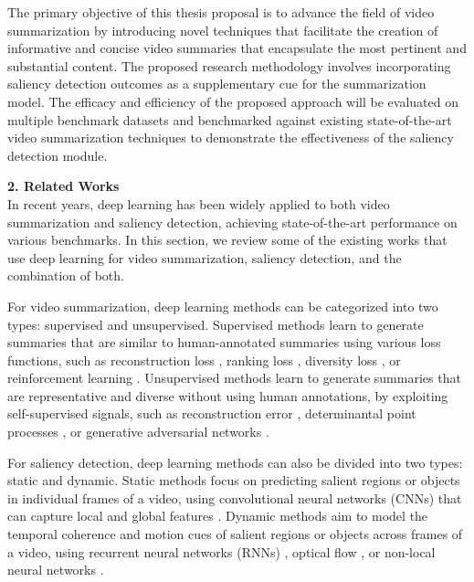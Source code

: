 \documentclass[14pt]{extarticle}
\begin{document}
    The primary objective of this thesis proposal is to advance the field of video summarization by introducing novel techniques that facilitate the creation of informative and concise video summaries that encapsulate the most pertinent and substantial content. The proposed research methodology involves incorporating saliency detection outcomes as a supplementary cue for the summarization model. The efficacy and efficiency of the proposed approach will be evaluated on multiple benchmark datasets and benchmarked against existing state-of-the-art video summarization techniques to demonstrate the effectiveness of the saliency detection module.

    \vspace{.5cm}
    \textbf{2. Related Works} \\
    In recent years, deep learning has been widely applied to both video summarization and saliency detection, achieving state-of-the-art performance on various benchmarks. In this section, we review some of the existing works that use deep learning for video summarization, saliency detection, and the combination of both.

    For video summarization, deep learning methods can be categorized into two types: supervised and unsupervised. Supervised methods learn to generate summaries that are similar to human-annotated summaries using various loss functions, such as reconstruction loss \cite{zhang2016video}, ranking loss \cite{song2015tvsum}, diversity loss \cite{zhou2018deepinterest}, or reinforcement learning \cite{zhang2018retrospective}. Unsupervised methods learn to generate summaries that are representative and diverse without using human annotations, by exploiting self-supervised signals, such as reconstruction error \cite{mahasseni2017unsupervised}, determinantal point processes \cite{gong2014diverse}, or generative adversarial networks \cite{wei2018unsupervised}.
    
    For saliency detection, deep learning methods can also be divided into two types: static and dynamic. Static methods focus on predicting salient regions or objects in individual frames of a video, using convolutional neural networks (CNNs) that can capture local and global features \cite{li2015visual}. Dynamic methods aim to model the temporal coherence and motion cues of salient regions or objects across frames of a video, using recurrent neural networks (RNNs) \cite{wang2015saliency}, optical flow \cite{bak2017spatio}, or non-local neural networks \cite{shokri2018salient}.
    
\end{document}
